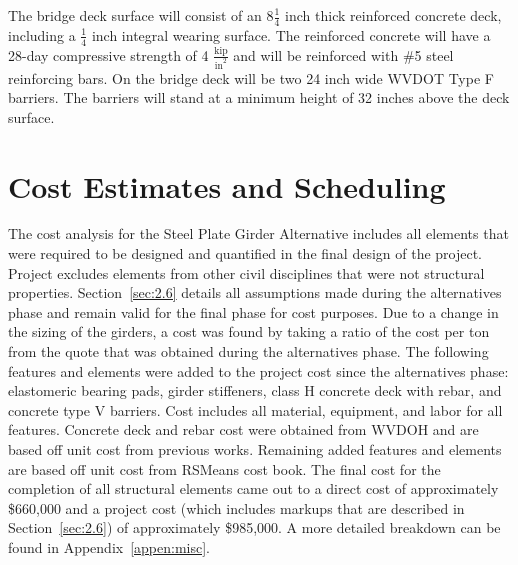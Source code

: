 The bridge deck surface will consist of an \(8\frac{1}{4}\) inch thick reinforced concrete deck, including a \(\frac{1}{4}\) inch integral wearing surface. The reinforced concrete will have a 28-day compressive strength of 4 \(\frac{\textrm{kip}}{\textrm{in}^{2}}\) and will be reinforced with \#5 steel reinforcing bars.  On the bridge deck will be two 24 inch wide WVDOT Type F barriers. The barriers will stand at a minimum height of 32 inches above the deck surface.

\section{Cost Estimates and Scheduling}
The cost analysis for the Steel Plate Girder Alternative includes all elements that were required to be designed and quantified in the final design of the project. Project excludes elements from other civil disciplines that were not structural properties. Section~\ref{sec:2.6} details all assumptions made during the alternatives phase and remain valid for the final phase for cost purposes. Due to a change in the sizing of the girders, a cost was found by taking a ratio of the cost per ton from the quote that was obtained during the alternatives phase. The following features and elements were added to the project cost since the alternatives phase: elastomeric bearing pads, girder stiffeners, class H concrete deck with rebar, and concrete type V barriers. Cost includes all material, equipment, and labor for all features. Concrete deck and rebar cost were obtained from WVDOH and are based off unit cost from previous works. Remaining added features and elements are based off unit cost from RSMeans cost book. The final cost for the completion of all structural elements came out to a direct cost of approximately \$660,000 and a project cost (which includes markups that are described in Section~\ref{sec:2.6}) of approximately \$985,000. A more detailed breakdown can be found in Appendix~\ref{appen:misc}.

